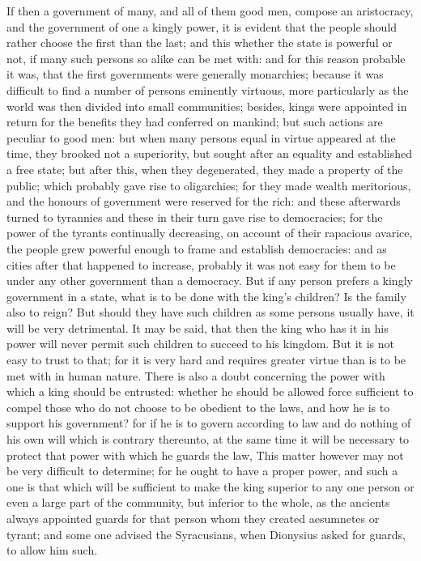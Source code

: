 If then a government of many, and all of them good men, compose an
aristocracy, and the government of one a kingly power, it is evident that
the people should rather choose the first than the last; and this whether
the state is powerful or not, if many such persons so alike can be met
with: and for this reason probable it was, that the first governments were
generally monarchies; because it was difficult to find a number of persons
eminently virtuous, more particularly as the world was then divided into
small communities; besides, kings were appointed in return for the
benefits they had conferred on mankind; but such actions are peculiar to
good men: but when many persons equal in virtue appeared at the time, they
brooked not a superiority, but sought after an equality and established a
free state; but after this, when they degenerated, they made a property of
the public; which probably gave rise to oligarchies; for they made wealth
meritorious, and the honours of government were reserved for the rich: and
these afterwards turned to tyrannies and these in their turn gave rise to
democracies; for the power of the tyrants continually decreasing, on
account of their rapacious avarice, the people grew powerful enough to
frame and establish democracies: and as cities after that happened to
increase, probably it was not easy for them to be under any other
government than a democracy. But if any person prefers a kingly government
in a state, what is to be done with the king's children? Is the family
also to reign? But should they have such children as some persons usually
have, it will be very detrimental. It may be said, that then the king who
has it in his power will never permit such children to succeed to his
kingdom. But it is not easy to trust to that; for it is very hard and
requires greater virtue than is to be met with in human nature. There is
also a doubt concerning the power with which a king should be entrusted:
whether he should be allowed force sufficient to compel those who do not
choose to be obedient to the laws, and how he is to support his
government? for if he is to govern according to law and do nothing of his
own will which is contrary thereunto, at the same time it will be
necessary to protect that power with which he guards the law, This matter
however may not be very difficult to determine; for he ought to have a
proper power, and such a one is that which will be sufficient to make the
king superior to any one person or even a large part of the community, but
inferior to the whole, as the ancients always appointed guards for that
person whom they created aesumnetes or tyrant; and some one advised the
Syracusians, when Dionysius asked for guards, to allow him such.

